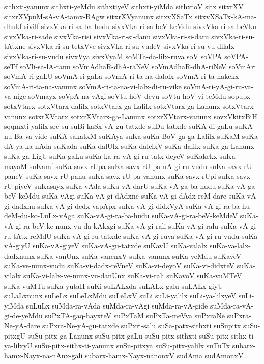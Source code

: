 {sithxti-yanunx
sithxti-yeMdu
sithxtiyeV
sithxti-yiMda
sithxtoV
sitx
sitxrXV
sitxrXVpuM-sA-vA-tamx-BAgw
sitxrXVyanunx
sitxvXSaTx
sitxvXSaTx-kA-ma-dhukf
sivilf
sivxVka-ri-sa-ba-hudu
sivxVka-ri-sa-beV-keMdu
sivxVka-ri-sa-beVku
sivxVka-ri-sade
sivxVka-risi
sivxVka-ri-si-danu
sivxVka-ri-si-daru
sivxVka-ri-su-tAtxne
sivxVka-ri-su-tetxVve
sivxVka-ri-su-vudeV
sivxVka-ri-su-vu-dilalx
sivxVka-ri-su-vudu
sivxVya
sivxVyaM
soMTa-da-lilx-ruva
soV
soVPA
soVPA-seTf
soVli-sa-lA-ranu
soVmAdhaR-dhA-raNeV
soVmAdhaR-dhA-riNeV
soVmAri
soVmA-ri-gaLU
soVmA-ri-gaLa
soVmA-ri-ta-na-dalolx
soVmA-ri-ta-nakekx
soVmA-ri-ta-na-vanunx
soVmA-ri-ta-na-vi-lalx-di-ru-vike
soVmA-ri-yA-gi-ru-va-va-nige
soVmayx
soVpA-na-vAgi
soVtu-hoV-devu
soVtu-hoV-yi-teMdu
sopupx
sotxVtarx
sotxVtarx-dalilx
sotxVtarx-ga-Lalilx
sotxVtarx-ga-Lanunx
sotxVtarx-vanunx
sotxrXVtarx
sotxrXVtarx-ga-Lanunx
sotxrXVtarx-vanunx
sovxVkitxBiH
sqqmxti-yalilx
src
su
suBi-kaSx-vA-gu-tatxde
suDu-tatxde
suKA-di-gaLu
suKA-nu-Ba-va-vide
suKA-sakatxM
suKAya
suKa
suKa-BoV-ga-ga-Lalilx
suKaM
suKa-dA-ya-ka-nAda
suKada
suKa-dalUlx
suKa-dalelxV
suKa-dalilx
suKa-ga-Lanunx
suKa-ga-LigU
suKa-gaLu
suKa-ka-ra-vA-gi-ru-tatx-deyeV
suKakekx
suKa-mayaM
suKamf
suKa-savx-rUpa
suKa-savx-rU-pa-nA-gi-ru-vudu
suKa-savx-rU-paneV
suKa-savx-rU-panu
suKa-savx-rU-pa-vanunx
suKa-savx-rUpi
suKa-savx-rU-piyeV
suKasayx
suKa-vAda
suKa-vA-darU
suKa-vA-ga-ba-hudu
suKa-vA-ga-beV-keMdu
suKa-vAgi
suKa-vA-gi-dAdxne
suKa-vA-gi-dAdx-reM-dare
suKa-vA-gi-dadxnu
suKa-vA-gi-dedx-vapApx
suKa-vA-gi-didxVyA
suKa-vA-gi-ra-ba-hu-deM-du-ko-LuLx-vAga
suKa-vA-gi-ra-ba-hudu
suKa-vA-gi-ra-beV-keMdeV
suKa-vA-gi-ra-beV-ke-nunx-vu-da-kAkxgi
suKa-vA-gi-rali
suKa-vA-gi-ralu
suKa-vA-gi-ru-tAtx-reMdU
suKa-vA-gi-ru-tatxde
suKa-vA-gi-ruva
suKa-vA-gi-ru-vudu
suKa-vA-giyU
suKa-vA-giyeV
suKa-vA-gu-tatxde
suKavU
suKa-valalx
suKa-va-lalx-dadxnunx
suKa-vanUnx
suKa-vanenxV
suKa-vanunx
suKa-veMdu
suKaveV
suKa-ve-nunx-vudu
suKa-vi-dadx-reVneV
suKa-vi-deyoV
suKa-vi-didxteV
suKa-vilalx
suKa-vi-lalx-ve-nunx-vu-danUnx
suKa-vi-rali
suKavoV
suKa-vuMTeV
suKa-vuMTu
suKa-yutaH
suKi
suLALxda
suLALx-galu
suLALx-giyU
suLaLxnunx
suLeLx
suLeLxMdu
suLeLxV
suLi
suLi-yalilx
suLi-ya-lilxyeV
suLi-yiMda
suLuLx
suMda-ra-vAda
suMda-ra-vAgi
suMda-ra-vA-gide
suMda-ra-vA-gi-de-yeMdu
suPxTA-gaq-hayxteV
suPxTaM
suPxTa-meVva
suPxraNe
suPxra-Ne-yA-dare
suPxra-Ne-yA-gu-tatxde
suPxri-salu
suSa-patx-sithxti
suSupitx
suSu-pitxgU
suSu-pitx-ga-Lanunx
suSu-pitx-gaLu
suSu-pitx-sithxti
suSu-pitx-sithx-ti-ya-lilxyU
suSu-pitx-sithx-ti-yanunx
suSu-pitxya
suSu-pitx-yalilx
suTuTx
subarx-hamx-Nayx-na-nAnx-gali
subarx-hamx-Nayx-nanonxV
sudAma
sudAmonxV
}
